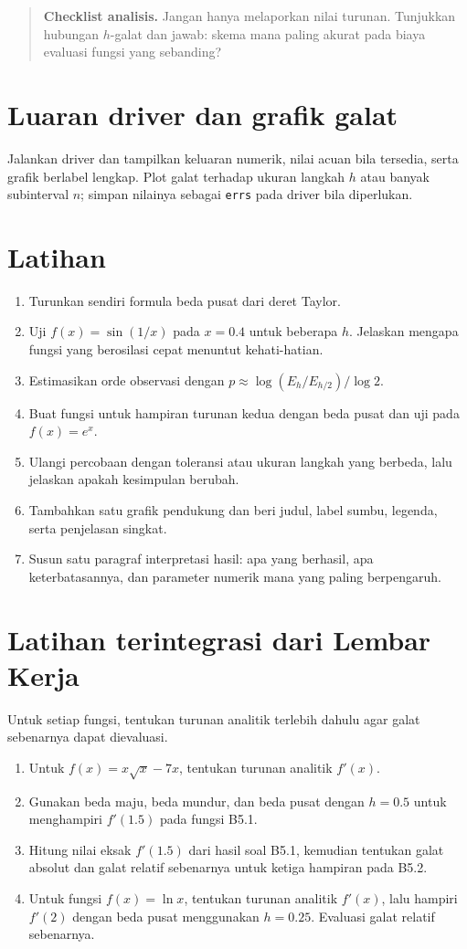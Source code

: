 \documentclass[book,english,noindex,lean,nobackpage,nocopyright,noupdate,nofiglist,notablist]{enacom}
\newcommand{\AnalysisCheck}[1]{\begin{quote}\textbf{Checklist analisis.} #1\end{quote}}
\begin{document}
\AnalysisCheck{Jangan hanya melaporkan nilai turunan. Tunjukkan hubungan $h$-galat dan jawab: skema mana paling akurat pada biaya evaluasi fungsi yang sebanding?}

\section{Luaran driver dan grafik galat}
Jalankan driver dan tampilkan keluaran numerik, nilai acuan bila tersedia, serta grafik berlabel lengkap. Plot galat terhadap ukuran langkah $h$ atau banyak subinterval $n$; simpan nilainya sebagai \texttt{errs} pada driver bila diperlukan.

\section{Latihan}
\begin{enumerate}
\item Turunkan sendiri formula beda pusat dari deret Taylor.
\item Uji $f(x)=\sin(1/x)$ pada $x=0.4$ untuk beberapa $h$. Jelaskan mengapa fungsi yang berosilasi cepat menuntut kehati-hatian.
\item Estimasikan orde observasi dengan $p\approx\log(E_h/E_{h/2})/\log 2$.
\item Buat fungsi untuk hampiran turunan kedua dengan beda pusat dan uji pada $f(x)=e^x$.

\item Ulangi percobaan dengan toleransi atau ukuran langkah yang berbeda, lalu jelaskan apakah kesimpulan berubah.
\item Tambahkan satu grafik pendukung dan beri judul, label sumbu, legenda, serta penjelasan singkat.
\item Susun satu paragraf interpretasi hasil: apa yang berhasil, apa keterbatasannya, dan parameter numerik mana yang paling berpengaruh.

\end{enumerate}

\section{Latihan terintegrasi dari Lembar Kerja}
Untuk setiap fungsi, tentukan turunan analitik terlebih dahulu agar galat sebenarnya dapat dievaluasi.
\begin{enumerate}
\item[\textbf{B5.1 (L1)}] Untuk \(f(x)=x\sqrt{x}-7x\), tentukan turunan analitik \(f'(x)\).
\item[\textbf{B5.2 (L2)}] Gunakan beda maju, beda mundur, dan beda pusat dengan \(h=0.5\) untuk menghampiri \(f'(1.5)\) pada fungsi B5.1.
\item[\textbf{B5.3 (L3)}] Hitung nilai eksak \(f'(1.5)\) dari hasil soal B5.1, kemudian tentukan galat absolut dan galat relatif sebenarnya untuk ketiga hampiran pada B5.2.
\item[\textbf{B5.4 (L4)}] Untuk fungsi \(f(x)=\ln x\), tentukan turunan analitik \(f'(x)\), lalu hampiri \(f'(2)\) dengan beda pusat menggunakan \(h=0.25\). Evaluasi galat relatif sebenarnya.
\end{enumerate}
\end{document}

